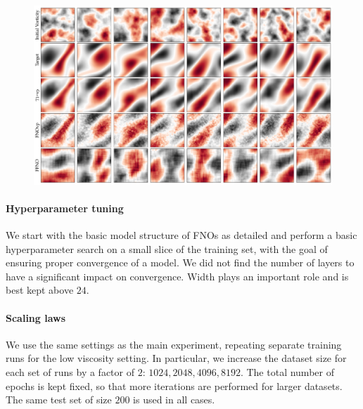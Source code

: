 \begin{figure}[h!]
    \centering
    \includegraphics[width=\linewidth]{figures/navier_stokes_predictions_big.pdf}
    \vspace{-3mm}
\label{fig:navier-stokes-predictions-big}
\end{figure}

\paragraph{Hyperparameter tuning}
%
We start with the basic model structure of FNOs as detailed \citep{li2020fourier} and perform a basic hyperparameter search on a small slice of the training set, with the goal of ensuring proper convergence of a model. We did not find the number of layers to have a significant impact on convergence. Width plays an important role and is best kept above $24$.

%
\paragraph{Scaling laws}
%
We use the same settings as the main experiment, repeating separate training runs for the low viscosity setting. In particular, we increase the dataset size for each set of runs by a factor of $2$: $1024, 2048, 4096, 8192$. The total number of epochs is kept fixed, so that more iterations are performed for larger datasets. The same test set of size $200$ is used in all cases.
%

